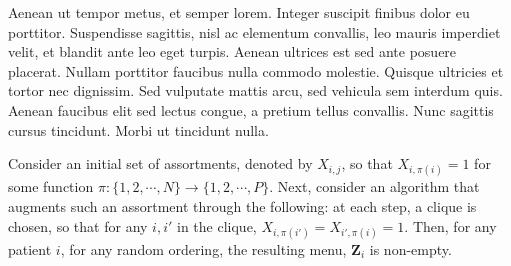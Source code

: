  Aenean ut tempor metus, et semper lorem. Integer suscipit finibus dolor eu porttitor. Suspendisse sagittis, nisl ac elementum convallis, leo mauris imperdiet velit, et blandit ante leo eget turpis. Aenean ultrices est sed ante posuere placerat. Nullam porttitor faucibus nulla commodo molestie. Quisque ultricies et tortor nec dignissim. Sed vulputate mattis arcu, sed vehicula sem interdum quis. Aenean faucibus elit sed lectus congue, a pretium tellus convallis. Nunc sagittis cursus tincidunt. Morbi ut tincidunt nulla.

\begin{lemma}
    Consider an initial set of assortments, denoted by $X_{i,j}$, so that $X_{i,\pi(i)} = 1$ for some function $\pi: \{1,2,\cdots,N\} \rightarrow \{1,2,\cdots,P\}$. 
    Next, consider an algorithm that augments such an assortment through the following: at each step, a clique is chosen, so that for any $i,i'$ in the clique, $X_{i,\pi(i')} = X_{i',\pi(i)} = 1$. Then, for any patient $i$, for any random ordering, the resulting menu, $\mathbf{Z}_{i}$ is non-empty. 
\end{lemma}

